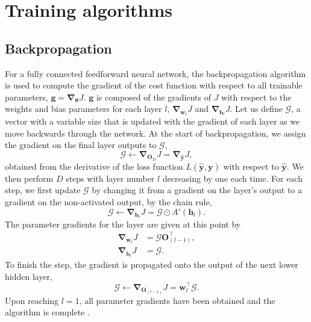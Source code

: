 \documentclass[12pt]{article}
\begin{document}


\appendix
\appendixpage
\section{Training algorithms}
\subsection{Backpropagation}
For a fully connected feedforward neural network, the backpropagation algorithm is used to compute the gradient of the cost function with respect to all trainable parameters, $\bm{g}=\bm\nabla_{\bm\theta}J$. $\bm{g}$ is composed of the gradients of $J$ with respect to the weights and bias parameters for each layer $l$, $\bm\nabla_{\bm{w}_l}J$ and $\bm\nabla_{\bm{b}_l}J$. Let us define $\bm{\mathcal{G}}$, a vector with a variable size that is updated with the gradient of each layer as we move backwards through the network. At the start of backpropagation, we assign the gradient on the final layer outputs to $\bm{\mathcal{G}}$,
\begin{equation}
\bm{\mathcal{G}}\leftarrow \bm\nabla_{\bm{O}_D}J=\bm\nabla_{\hat{\bm{y}}}J, 
\end{equation} 
obtained from the derivative of the loss function $L(\hat{\bm{y}},\bm{y})$ with respect to $\hat{\bm{y}}$. We then perform $D$ steps with layer number $l$ decreasing by one each time. For each step, we first update $\bm{\mathcal{G}}$ by changing it from a gradient on the layer's output to a gradient on the non-activated output, by the chain rule,
\begin{equation}
\bm{\mathcal{G}}\leftarrow \bm{\nabla}_{\bm{h}_l}J=\bm{\mathcal{G}}\odot A'(\bm{h}_l).
\end{equation}
The parameter gradients for the layer are given at this point by
\begin{align}
\bm\nabla_{\bm{w}_l}J&=\bm{\mathcal{G}}\bm{O}_{(l-1)}^{\top},\\
\bm\nabla_{\bm{b}_l}J&=\bm{\mathcal{G}}.
\end{align}
To finish the step, the gradient is propagated onto the output of the next lower hidden layer,
\begin{equation}
\bm{\mathcal{G}}\leftarrow \bm{\nabla}_{\bm{O}_{(l-1)}}J=\bm{w}_l^{\top}\bm{\mathcal{G}}.
\end{equation}
Upon reaching $l=1$, all parameter gradients have been obtained and the algorithm is complete \cite{Rumelhart86, Goodfellow16}.
\end{document}
